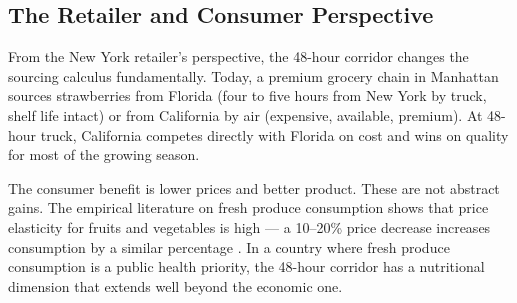 \subsection{The Retailer and Consumer Perspective}

From the New York retailer's perspective, the 48-hour corridor changes the sourcing
calculus fundamentally. Today, a premium grocery chain in Manhattan sources strawberries
from Florida (four to five hours from New York by truck, shelf life intact) or from
California by air (expensive, available, premium). At 48-hour truck, California competes
directly with Florida on cost and wins on quality for most of the growing season.

The consumer benefit is lower prices and better product. These are not abstract gains.
The empirical literature on fresh produce consumption shows that price elasticity for
fruits and vegetables is high --- a 10--20\% price decrease increases consumption by
a similar percentage \citep{USDA_NASS2023}. In a country where fresh produce consumption
is a public health priority, the 48-hour corridor has a nutritional dimension that
extends well beyond the economic one.
